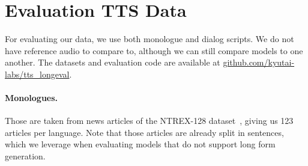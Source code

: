 \begin{table}[t]
\centering
\caption{\textbf{Short-form ASR performance across model sizes}. We report Word Error Rates (WER, \%) for a \oursASR{} model with 300M parameters, along with reference models.}
\label{tab:300m-ablation}
\begin{sc}
\end{sc}
\end{table}



\section{Evaluation TTS Data}
\label{sec:app:eval_data}
For evaluating our data, we use both monologue and dialog scripts. 
We do not have reference audio to compare to, although we can still compare models to one another. The datasets and evaluation code are available at \href{https://github.com/kyutai-labs/tts_longeval}{github.com/kyutai-labs/tts\_longeval}.

\paragraph{Monologues.}
Those are taken from news articles of the NTREX-128 dataset~\citep{federmann-etal-2022-ntrex}, giving us 123 articles per language. Note that those articles are already split in sentences, which we leverage when evaluating models that do not support long form generation.

